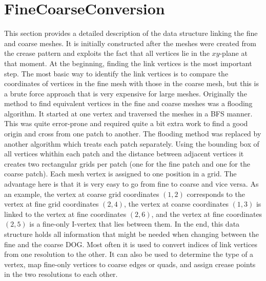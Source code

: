 \documentclass[a4paper,twoside,12pt,nochapterprefix]{scrbook}
\begin{document}
\section{FineCoarseConversion}\label{sec:conversion}
This section provides a detailed description of the data structure linking the fine and coarse meshes. It is initially constructed after the meshes were created from the crease pattern and exploits the fact that all vertices lie in the $xy$-plane at that moment.\newline
At the beginning, finding the link vertices is the most important step. The most basic way to identify the link vertices is to compare the coordinates of vertices in the fine mesh with those in the coarse mesh, but this is a brute force approach that is very expensive for large meshes.\newline
Originally the method to find equivalent vertices in the fine and coarse meshes was a flooding algorithm. It started at one vertex and traversed the meshes in a BFS manner. This was quite error-prone and required quite a bit extra work to find a good origin and cross from one patch to another.\newline
The flooding method was replaced by another algorithm which treats each patch separately. Using the bounding box of all vertices whithin each patch and the distance between adjacent vertices it creates two rectangular grids per patch (one for the fine patch and one for the coarse patch). Each mesh vertex is assigned to one position in a grid. The advantage here is that it is very easy to go from fine to coarse and vice versa. As an example, the vertex at coarse grid coordinates $(1,2)$ corresponds to the vertex at fine grid coordinates $(2,4)$, the vertex at coarse coordinates $(1,3)$ is linked to the vertex at fine coordinates $(2,6)$, and the vertex at fine coordinates $(2,5)$ is a fine-only I-vertex that lies between them.\newline
In the end, this data structure holds all information that might be needed when changing between the fine and the coarse DOG. Most often it is used to convert indices of link vertices from one resolution to the other. It can also be used to determine the type of a vertex, map fine-only vertices to coarse edges or quads, and assign crease points in the two resolutions to each other.\newline
\end{document}
